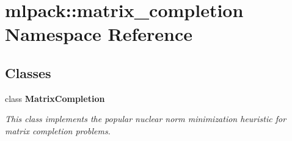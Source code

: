 \section{mlpack\+:\+:matrix\+\_\+completion Namespace Reference}
\label{namespacemlpack_1_1matrix__completion}
\subsection*{Classes}
\begin{DoxyCompactItemize}
\item 
class {\bf Matrix\+Completion}
\begin{DoxyCompactList}\small\item\em This class implements the popular nuclear norm minimization heuristic for matrix completion problems. \end{DoxyCompactList}\end{DoxyCompactItemize}
